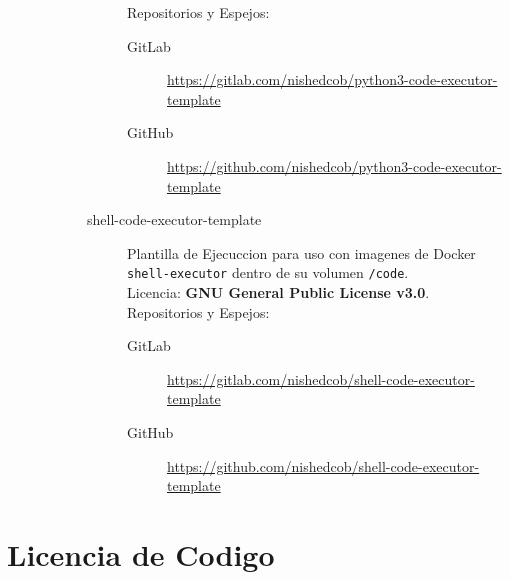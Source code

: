 \begin{description}
\begin{description}
\begin{description}
            Repositorios y Espejos:
            \begin{description}
            	\item[GitLab] \sloppy \url{https://gitlab.com/nishedcob/python3-code-executor-template}
                \item[GitHub] \sloppy \url{https://github.com/nishedcob/python3-code-executor-template}
            \end{description}
        	\item[shell-code-executor-template] Plantilla de Ejecuccion para uso con imagenes de Docker \texttt{shell-executor} dentro de su volumen \texttt{/code}.\\
            Licencia: \textbf{GNU General Public License v3.0}. \\
            Repositorios y Espejos:
            \begin{description}
            	\item[GitLab] \sloppy \url{https://gitlab.com/nishedcob/shell-code-executor-template}
                \item[GitHub] \sloppy \url{https://github.com/nishedcob/shell-code-executor-template}
            \end{description}
        \end{description}
    \end{description}
\end{description}

\section{Licencia de Codigo}
